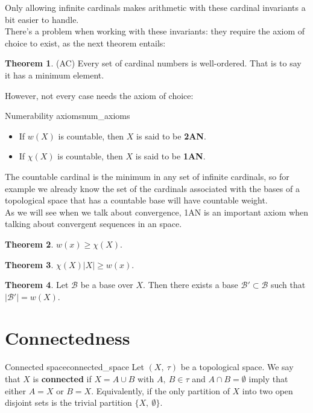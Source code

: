 \documentclass[a4paper]{book}
\theoremstyle{definition}
\newtheorem{theorem}{Theorem}[section]
\theoremstyle{ejemplo}
\theoremstyle{demostracion}
\begin{document}
Only allowing infinite cardinals makes arithmetic with these cardinal invariants a bit easier to handle.\\ 
There's a problem when working with these invariants: they require the axiom of choice to exist, as the next theorem entails:
\begin{theorem}
	(AC) Every set of cardinal numbers is well-ordered. That is to say it has a minimum element.
\end{theorem}
However, not every case needs the axiom of choice:

\begin{define}{Numerability axioms}{num_axioms}
\begin{itemize}
	\item
	If $w(X)$ is countable, then $X$ is said to be \textbf{2AN}.
	\item
	If $\chi(X)$ is countable, then $X$ is said to be \textbf{1AN}.
\end{itemize}
\end{define}

The countable cardinal is the minimum in any set of infinite cardinals, so for example we already know the set of the cardinals associated with the bases of a topological space that has a countable base will have countable weight.\\ 
As we will see when we talk about convergence, 1AN is an important axiom when talking about convergent sequences in an space.\\ 

\begin{theorem}
	$w(x) \geq \chi(X)$.
\end{theorem}

\begin{theorem}
	$\chi(X)|X| \geq w(x)$.
\end{theorem}

\begin{theorem}
	Let $\mathcal{B}$ be a base over $X$. Then there exists a base $\mathcal{B}' \subset \mathcal{B}$ such that $|\mathcal{B}'| = w(X)$.
\end{theorem}

\section{Connectedness}
\begin{define}{Connected space}{connected_space}
	Let $(X,\ \tau)$ be a topological space. We say that $X$ is \textbf{connected} if $X = A \cup B$ with $A,\ B \in \tau$ and $A \cap B = \emptyset$ imply that either $A = X$ or $B = X$. Equivalently, if the only partition of $X$ into two open disjoint sets is the trivial partition $\{ X,\ \emptyset\}$.
\end{define}
\end{document}
